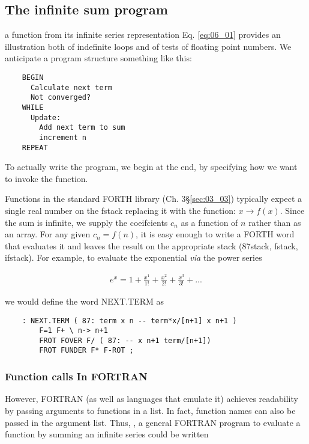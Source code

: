 \subsection{The infinite sum program}
 a function from its infinite series representation Eq. \ref{eq:06_01} provides an illustration both of indefinite loops and of tests of floating point numbers. We anticipate a program structure something like this:

\begin{lstlisting}
    BEGIN
      Calculate next term
      Not converged?
    WHILE
      Update:
        Add next term to sum
        increment n
    REPEAT
\end{lstlisting}

To actually write the program, we begin at the end, by specifying how we want to invoke the function.

Functions in the standard FORTH library (Ch. 3\S\ref{sec:03_03}) typically expect a single real number on the fstack replacing it with the function: $x \rightarrow f(x)$. Since the sum is infinite, we supply the coeifcients $c_n$ as a function of $n$ rather than as an array. For any given $c_n=f(n)$, it is easy enough to write a FORTH word that evaluates it and leaves the result on the appropriate stack (87stack, fstack, ifstack). For example, to evaluate the exponential \textit{via} the power series

\begin{align}
e^x = 1 + \frac{x^1}{1!} + \frac{x^2}{2!} + \frac{x^3}{3!} + ...
\end{align}

we would define the word NEXT.TERM as

\begin{lstlisting}
    : NEXT.TERM ( 87: term x n -- term*x/[n+1] x n+1 )
        F=1 F+ \ n-> n+1
        FROT FOVER F/ ( 87: -- x n+1 term/[n+1])
        FROT FUNDER F* F-ROT ;
\end{lstlisting}

\subsubsection{Function calls In FORTRAN}
However, FORTRAN (as well as languages that emulate it) achieves readability by passing arguments to functions in a list. In fact, function names can also be passed in the argument list. Thus, \eg, a general FORTRAN program to evaluate a function by summing an infinite series could be written

